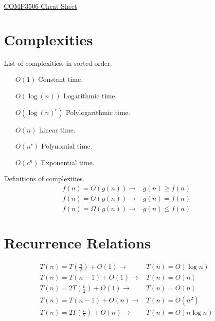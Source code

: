 \documentclass[landscape]{cheat}
\begin{document}
\footnotesize
\begin{multicols}{3}

\begin{center}
\Large{\underline{COMP3506 Cheat Sheet}} \\
\end{center}

\section{Complexities}
List of complexities, in sorted order.
\begin{itemize}
    \item[$O(1)$] Constant time.
    \item[$O(\log(n))$] Logarithmic time.
    \item[$O(\log(n)^c)$] Polylogarithmic time.
    \item[$O(n)$] Linear time.
    \item[$O(n^c)$] Polynomial time.
    \item[$O(c^n)$] Exponential time.
\end{itemize}
Definitions of complexities.
\begin{align*}
    f(n) = O(g(n)) \rightarrow& g(n) \geq f(n) \\
    f(n) = \Theta(g(n)) \rightarrow& g(n) = f(n) \\
    f(n) = \Omega(g(n)) \rightarrow& g(n) \leq f(n)
\end{align*}

\section{Recurrence Relations}
\begin{align*}
    T(n) = T(\frac n 2) + O(1) \rightarrow& T(n) = O(\log n) \\
    T(n) = T(n - 1) + O(1) \rightarrow& T(n) = O(n) \\
    T(n) = 2 T(\frac n 2) + O(1) \rightarrow& T(n) = O(n) \\
    T(n) = T(n - 1) + O(n) \rightarrow& T(n) = O(n^2) \\
    T(n) = 2 T(\frac n 2) + O(n) \rightarrow& T(n) = O(n \log n)
\end{align*}


\end{multicols}
\end{document}
